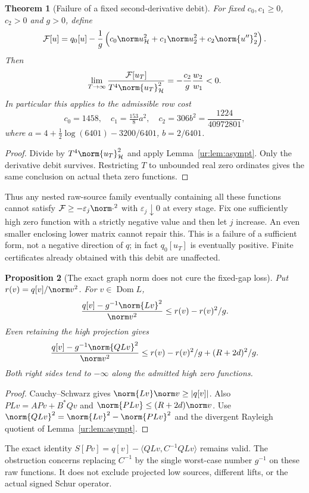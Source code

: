 \documentclass[11pt,a4paper]{article}
\numberwithin{equation}{section}
\newtheorem{theorem}{Theorem}[section]
\newtheorem{proposition}[theorem]{Proposition}
\theoremstyle{definition}\newtheorem{definition}[theorem]{Definition}
\theoremstyle{remark}\newtheorem{remark}[theorem]{Remark}
\newcommand{\Hh}{\mathcal H}\newcommand{\Hw}{\mathcal H}
\begin{document}
\begin{theorem}[Failure of a fixed second-derivative debit]\label{ur:thm:obstruction}
For fixed $c_0,c_1\ge0$, $c_2>0$ and $g>0$, define
\[
 \mathcal F[u]=q_0[u]-\frac1g
  \left(c_0\norm u_\Hh^2+c_1\norm u_2^2+c_2\norm{u''}_2^2\right).
\]
Then
\begin{equation}\label{ur:eq:quartic}
 \lim_{T\to\infty}\frac{\mathcal F[u_T]}
                   {T^4\norm{u_T}_\Hh^2}
 =-\frac{c_2}{g}\frac{w_2}{w_1}<0.
\end{equation}
In particular this applies to the admissible row cost
\[
 c_0=1458,\quad c_1=\tfrac{153}{8}a^2,\quad
 c_2=306b^2=\frac{1224}{40972801},
\]
where $a=4+\tfrac12\log(6401)-3200/6401$, $b=2/6401$.
\end{theorem}
\begin{proof}
Divide by $T^4\norm{u_T}_\Hh^2$ and apply Lemma~\ref{ur:lem:asympt}.
Only the derivative debit survives. Restricting $T$ to unbounded real
zero ordinates gives the same conclusion on actual theta zero functions.
\end{proof}
Thus any nested raw-source family eventually containing all these
functions cannot satisfy $\mathcal F\ge-\varepsilon_j\norm\cdot^2$
with $\varepsilon_j\downarrow0$ at every stage. Fix one sufficiently
high zero function with a strictly negative value and then let $j$
increase. An even smaller enclosing lower matrix cannot repair this.
This is a failure of a sufficient form, not a negative direction of $q$;
in fact $q_0[u_T]$ is eventually positive. Finite certificates already
obtained with this debit are unaffected.

\begin{proposition}[The exact graph norm does not cure the fixed-gap loss]
Put $r(v)=q[v]/\norm v^2$. For $v\in\operatorname{Dom}L$,
\[
 \frac{q[v]-g^{-1}\norm{Lv}^2}{\norm v^2}
 \le r(v)-r(v)^2/g.
\]
Even retaining the high projection gives
\[
 \frac{q[v]-g^{-1}\norm{QLv}^2}{\norm v^2}
 \le r(v)-r(v)^2/g+(R+2d)^2/g.
\]
Both right sides tend to $-\infty$ along the admitted high zero functions.
\end{proposition}
\begin{proof}
Cauchy--Schwarz gives $\norm{Lv}\norm v\ge|q[v]|$.
Also $PLv=APv+B^*Qv$ and
$\norm{PLv}\le(R+2d)\norm v$. Use
$\norm{QLv}^2=\norm{Lv}^2-\norm{PLv}^2$ and the divergent Rayleigh
quotient of Lemma~\ref{ur:lem:asympt}.
\end{proof}
The exact identity
$S[Pv]=q[v]-\langle QLv,C^{-1}QLv\rangle$ remains valid.
The obstruction concerns replacing $C^{-1}$ by the single worst-case
number $g^{-1}$ on these raw functions. It does not exclude projected
low sources, different lifts, or the actual signed Schur operator.
\end{document}
